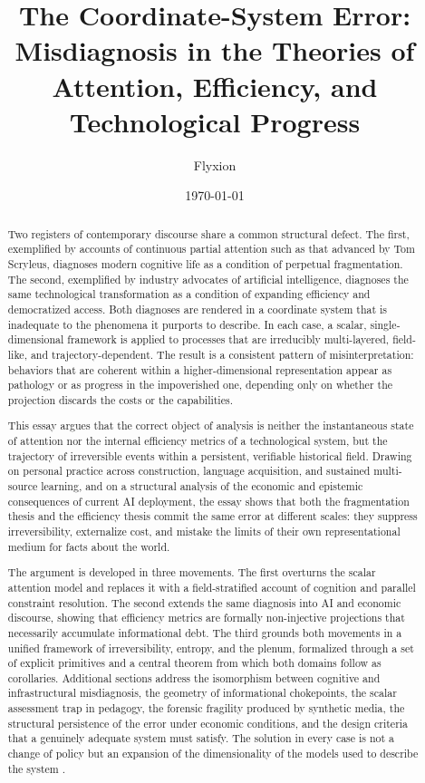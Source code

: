 \documentclass[12pt, a4paper]{article}
\title{\textbf{The Coordinate-System Error:\\
Misdiagnosis in the Theories of Attention, Efficiency, and Technological Progress}}
\author{Flyxion}
\date{\today}
\begin{document}
\maketitle

\begin{abstract}
\noindent
Two registers of contemporary discourse share a common structural defect. The first, exemplified by accounts of continuous partial attention such as that advanced by Tom Scryleus, diagnoses modern cognitive life as a condition of perpetual fragmentation. The second, exemplified by industry advocates of artificial intelligence, diagnoses the same technological transformation as a condition of expanding efficiency and democratized access. Both diagnoses are rendered in a coordinate system that is inadequate to the phenomena it purports to describe. In each case, a scalar, single-dimensional framework is applied to processes that are irreducibly multi-layered, field-like, and trajectory-dependent. The result is a consistent pattern of misinterpretation: behaviors that are coherent within a higher-dimensional representation appear as pathology or as progress in the impoverished one, depending only on whether the projection discards the costs or the capabilities.

This essay argues that the correct object of analysis is neither the instantaneous state of attention nor the internal efficiency metrics of a technological system, but the trajectory of irreversible events within a persistent, verifiable historical field. Drawing on personal practice across construction, language acquisition, and sustained multi-source learning, and on a structural analysis of the economic and epistemic consequences of current AI deployment, the essay shows that both the fragmentation thesis and the efficiency thesis commit the same error at different scales: they suppress irreversibility, externalize cost, and mistake the limits of their own representational medium for facts about the world.

The argument is developed in three movements. The first overturns the scalar attention model and replaces it with a field-stratified account of cognition and parallel constraint resolution. The second extends the same diagnosis into AI and economic discourse, showing that efficiency metrics are formally non-injective projections that necessarily accumulate informational debt. The third grounds both movements in a unified framework of irreversibility, entropy, and the plenum, formalized through a set of explicit primitives and a central theorem from which both domains follow as corollaries. Additional sections address the isomorphism between cognitive and infrastructural misdiagnosis, the geometry of informational chokepoints, the scalar assessment trap in pedagogy, the forensic fragility produced by synthetic media, the structural persistence of the error under economic conditions, and the design criteria that a genuinely adequate system must satisfy. The solution in every case is not a change of policy but an expansion of the dimensionality of the models used to describe the system \cite{Prigogine1984,Shannon1948,Friston2010}.
\end{abstract}
\end{document}
